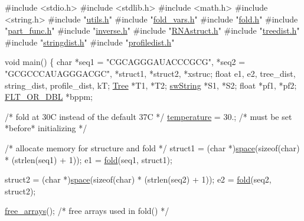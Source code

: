 \begin{DoxyCodeInclude}
\textcolor{preprocessor}{#include  <stdio.h>}
\textcolor{preprocessor}{#include  <stdlib.h>}
\textcolor{preprocessor}{#include  <math.h>}
\textcolor{preprocessor}{#include  <string.h>}
\textcolor{preprocessor}{#include  "\hyperlink{utils_8h}{utils.h}"}
\textcolor{preprocessor}{#include  "\hyperlink{fold__vars_8h}{fold\_vars.h}"}
\textcolor{preprocessor}{#include  "\hyperlink{fold_8h}{fold.h}"}
\textcolor{preprocessor}{#include  "\hyperlink{part__func_8h}{part\_func.h}"}
\textcolor{preprocessor}{#include  "\hyperlink{inverse_8h}{inverse.h}"}
\textcolor{preprocessor}{#include  "\hyperlink{RNAstruct_8h}{RNAstruct.h}"}
\textcolor{preprocessor}{#include  "\hyperlink{treedist_8h}{treedist.h}"}
\textcolor{preprocessor}{#include  "\hyperlink{stringdist_8h}{stringdist.h}"}
\textcolor{preprocessor}{#include  "\hyperlink{profiledist_8h}{profiledist.h}"}

\textcolor{keywordtype}{void}
main()
\{
  \textcolor{keywordtype}{char}        *seq1 = \textcolor{stringliteral}{"CGCAGGGAUACCCGCG"}, *seq2 = \textcolor{stringliteral}{"GCGCCCAUAGGGACGC"},
              *struct1, *struct2, *xstruc;
  \textcolor{keywordtype}{float}       e1, e2, tree\_dist, string\_dist, profile\_dist, kT;
  \hyperlink{structTree}{Tree}        *T1, *T2;
  \hyperlink{structswString}{swString}    *S1, *S2;
  \textcolor{keywordtype}{float}       *pf1, *pf2;
  \hyperlink{group__data__structures_ga31125aeace516926bf7f251f759b6126}{FLT\_OR\_DBL}  *bppm;

  \textcolor{comment}{/* fold at 30C instead of the default 37C */}
  \hyperlink{group__model__details_gab4b11c8d9c758430960896bc3fe82ead}{temperature} = 30.;       \textcolor{comment}{/* must be set *before* initializing  */}

  \textcolor{comment}{/* allocate memory for structure and fold */}
  struct1 = (\textcolor{keywordtype}{char} *)\hyperlink{utils_8h_ad7e1e137b3bf1f7108933d302a7f0177}{space}(\textcolor{keyword}{sizeof}(\textcolor{keywordtype}{char}) * (strlen(seq1) + 1));
  e1      = \hyperlink{group__mfe__fold__single_gaadafcb0f140795ae62e5ca027e335a9b}{fold}(seq1, struct1);

  struct2 = (\textcolor{keywordtype}{char} *)\hyperlink{utils_8h_ad7e1e137b3bf1f7108933d302a7f0177}{space}(\textcolor{keyword}{sizeof}(\textcolor{keywordtype}{char}) * (strlen(seq2) + 1));
  e2      = \hyperlink{group__mfe__fold__single_gaadafcb0f140795ae62e5ca027e335a9b}{fold}(seq2, struct2);

  \hyperlink{group__mfe__fold__single_ga107fdfe5fd641868156bfd849f6866c7}{free\_arrays}();      \textcolor{comment}{/* free arrays used in fold() */}


\end{DoxyCodeInclude}
